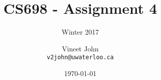 \documentclass[parskip=half]{scrartcl}
\begin{document}
\title{CS698 - Assignment 4}
\subtitle{Winter 2017}
\author{
    Vineet John\\
    \texttt{v2john@uwaterloo.ca}
}
\date{\today}
\maketitle
\end{document}
